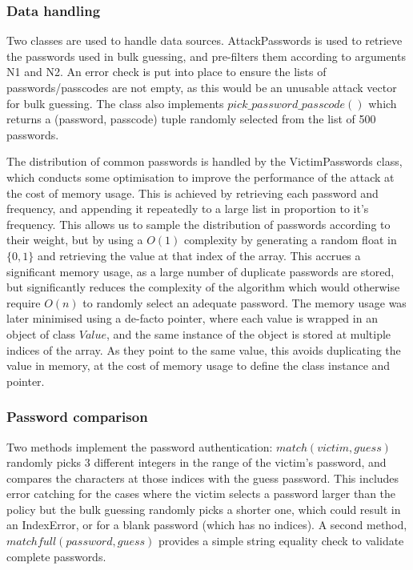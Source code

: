 \documentclass[british,10pt,a4paper]{article}
\begin{document}
\subsubsection{Data handling}
Two classes are used to handle data sources. AttackPasswords is used to retrieve the passwords used in bulk guessing, and pre-filters them according to arguments N1 and N2. An error check is put into place to ensure the lists of passwords/passcodes are not empty, as this would be an unusable attack vector for bulk guessing. The class also implements $pick\_password\_passcode()$ which returns a (password, passcode) tuple randomly selected from the list of 500 passwords.

The distribution of common passwords is handled by the VictimPasswords class, which conducts some optimisation to improve the performance of the attack at the cost of memory usage. This is achieved by retrieving each password and frequency, and appending it repeatedly to a large list in proportion to it's frequency. This allows us to sample the distribution of passwords according to their weight, but by using a $O(1)$ complexity by generating a random float in $\{0,1\}$ and retrieving the value at that index of the array. This accrues a significant memory usage, as a large number of duplicate passwords are stored, but significantly reduces the complexity of the algorithm which would otherwise require $O(n)$ to randomly select an adequate password. The memory usage was later minimised using a de-facto pointer, where each value is wrapped in an object of class $Value$, and the same instance of the object is stored at multiple indices of the array. As they point to the same value, this avoids duplicating the value in memory, at the cost of memory usage to define the class instance and pointer.

\subsubsection{Password comparison}
Two methods implement the password authentication: $match(victim, guess)$ randomly picks 3 different integers in the range of the victim's password, and compares the characters at those indices with the guess password. This includes error catching for the cases where the victim selects a password larger than the policy but the bulk guessing randomly picks a shorter one, which could result in an IndexError, or for a blank password (which has no indices). A second method, $matchfull(password, guess)$ provides a simple string equality check to validate complete passwords.
 
\end{document}
